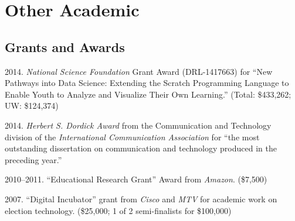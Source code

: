 \documentclass[10pt]{article}
\newenvironment{cvlist}{
\begin{list}{}{\leftmargin=3.0em \itemindent=-3.0em}
  \setlength{\itemsep}{0pt}
  \setlength{\parskip}{0em}
  \setlength{\parsep}{1em}
  \setlength{\parindent}{0em}}
{\vspace{1em}
\end{list}}
\begin{document}

\section{Other Academic}


\subsection{Grants and Awards}

\begin{cvlist}
\item 2014. \emph{National Science Foundation} Grant Award (DRL-1417663) for ``New Pathways into Data Science: Extending the Scratch Programming Language to Enable Youth to Analyze and Visualize Their Own Learning.'' (Total: \$433,262; UW: \$124,374)
\item 2014. \emph{Herbert S. Dordick Award} from the Communication and Technology division of the \emph{International Communication Association} for ``the most outstanding dissertation on communication and technology produced in the preceding year.''
\item 2010--2011. ``Educational Research Grant'' Award from \emph{Amazon}. (\$7,500)
\item 2007. ``Digital Incubator'' grant from \emph{Cisco} and \emph{MTV} for academic work on election technology. (\$25,000; 1 of 2 semi-finalists for \$100,000)
\end{cvlist}
\end{document}
